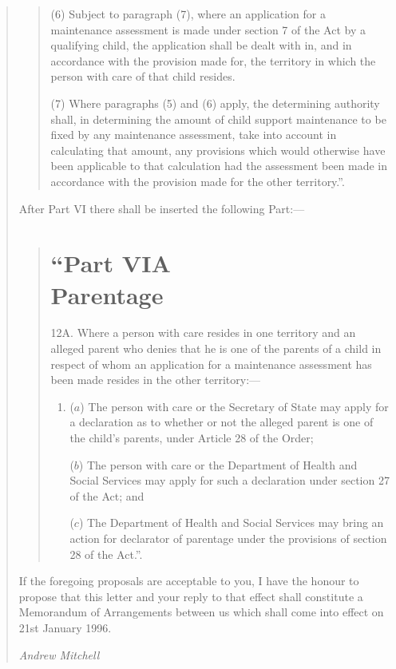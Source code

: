 \documentclass[a4paper]{article}
\begin{document}
\begin{quotation}
\begin{quotation}
(6) Subject to paragraph (7), where an application for a maintenance assessment is made under section 7 of the Act by a qualifying child, the application shall be dealt with in, and in accordance with the provision made for, the territory in which the person with care of that child resides.

(7) Where paragraphs (5) and (6) apply, the determining authority shall, in determining the amount of child support maintenance to be fixed by any maintenance assessment, take into account in calculating that amount, any provisions which would otherwise have been applicable to that calculation had the assessment been made in accordance with the provision made for the other territory.”.
\end{quotation}

  After Part VI there shall be inserted the following Part:—
\begin{quotation}
 \part*{“Part VIA\\Parentage}

12A.  Where a person with care resides in one territory and an alleged parent who denies that he is one of the parents of a child in respect of whom an application for a maintenance assessment has been made resides in the other territory:—
\begin{enumerate}\item[]
($a$) The person with care or the Secretary of State may apply for a declaration as to whether or not the alleged parent is one of the child’s parents, under Article 28 of the Order;

($b$) The person with care or the Department of Health and Social Services may apply for such a declaration under section 27 of the Act; and

($c$) The Department of Health and Social Services may bring an action for declarator of parentage under the provisions of section 28 of the Act.”.
\end{enumerate}
\end{quotation}

  If the foregoing proposals are acceptable to you, I have the honour to propose that this letter and your reply to that effect shall constitute a Memorandum of Arrangements between us which shall come into effect on 21st January 1996.

  \emph{Andrew Mitchell}


\end{quotation}
\end{document}
